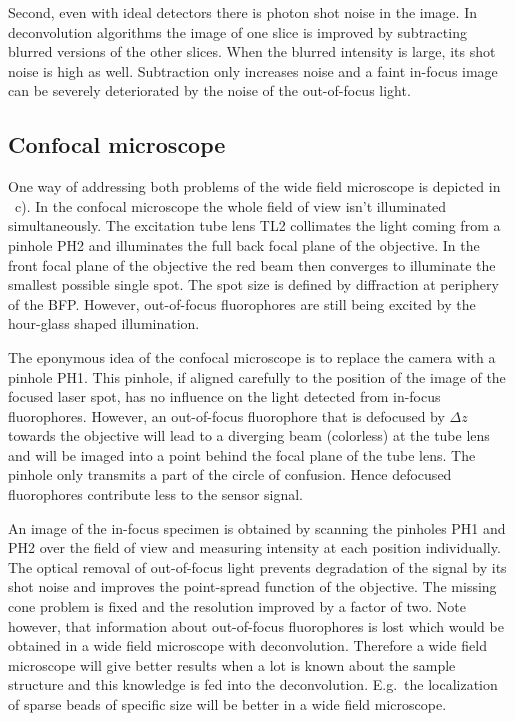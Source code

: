 Second, even with ideal detectors there is photon shot noise in the
image. In deconvolution algorithms the image of one slice is improved
by subtracting blurred versions of the other slices. When the blurred
intensity is large, its shot noise is high as well. Subtraction only
increases noise and a faint in-focus image can be severely
deteriorated by the noise of the out-of-focus light.
\subsection{Confocal microscope}
One way of addressing both problems of the wide field microscope is
depicted in ~c). In the confocal
microscope the whole field of view isn't illuminated simultaneously.
The excitation tube lens TL2 collimates the light coming from a
pinhole PH2 and illuminates the full back focal plane of the
objective. In the front focal plane of the objective the red beam then
converges to illuminate the smallest possible single spot. The spot
size is defined by diffraction at periphery of the BFP. However,
out-of-focus fluorophores are still being excited by the hour-glass
shaped illumination.

The eponymous idea of the confocal microscope is to replace the camera
with a pinhole PH1. This pinhole, if aligned carefully to the position
of the image of the focused laser spot, has no influence on the light
detected from in-focus fluorophores. However, an out-of-focus
fluorophore that is defocused by $\Delta z$ towards the objective will
lead to a diverging beam (colorless) at the tube lens and will be
imaged into a point behind the focal plane of the tube lens. The
pinhole only transmits a part of the circle of confusion. Hence
defocused fluorophores contribute less to the sensor signal.

An image of the in-focus specimen is obtained by scanning the pinholes
PH1 and PH2 over the field of view and measuring intensity at each
position individually. The optical removal of out-of-focus light
prevents degradation of the signal by its shot noise and improves the
point-spread function of the objective. The missing cone problem is
fixed and the resolution improved by a factor of two. Note however,
that information about out-of-focus fluorophores is lost which would
be obtained in a wide field microscope with deconvolution. Therefore a
wide field microscope will give better results when a lot is known
about the sample structure and this knowledge is fed into the
deconvolution. E.g.\ the localization of sparse beads of specific size
will be better in a wide field microscope.


